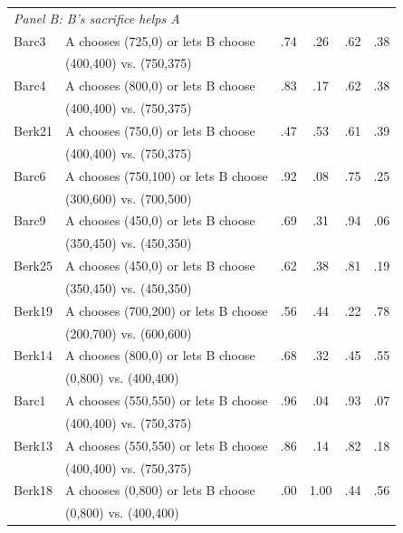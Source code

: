 \documentclass[11pt]{article}
\theoremstyle{definition}
\begin{document}
\begin{table}[h!]
\begin{center}
\begin{tabular}{llcccc}
\multicolumn{6}{l}{\textit{Panel B: B's sacrifice helps A}} \\[0.5ex]
Barc3 & A chooses (725,0) or lets B choose & .74 & .26 & .62 & .38 \\
& (400,400) vs. (750,375) & & & & \\
Barc4 & A chooses (800,0) or lets B choose & .83 & .17 & .62 & .38 \\
& (400,400) vs. (750,375) & & & & \\
Berk21 & A chooses (750,0) or lets B choose & .47 & .53 & .61 & .39 \\
& (400,400) vs. (750,375) & & & & \\
Barc6 & A chooses (750,100) or lets B choose & .92 & .08 & .75 & .25 \\
& (300,600) vs. (700,500) & & & & \\
Barc9 & A chooses (450,0) or lets B choose & .69 & .31 & .94 & .06 \\
& (350,450) vs. (450,350) & & & & \\
Berk25 & A chooses (450,0) or lets B choose & .62 & .38 & .81 & .19 \\
& (350,450) vs. (450,350) & & & & \\
Berk19 & A chooses (700,200) or lets B choose & .56 & .44 & .22 & .78 \\
& (200,700) vs. (600,600) & & & & \\
Berk14 & A chooses (800,0) or lets B choose & .68 & .32 & .45 & .55 \\
& (0,800) vs. (400,400) & & & & \\
Barc1 & A chooses (550,550) or lets B choose & .96 & .04 & .93 & .07 \\
& (400,400) vs. (750,375) & & & & \\
Berk13 & A chooses (550,550) or lets B choose & .86 & .14 & .82 & .18 \\
& (400,400) vs. (750,375) & & & & \\
Berk18 & A chooses (0,800) or lets B choose & .00 & 1.00 & .44 & .56 \\
& (0,800) vs. (400,400) & & & & \\[1ex]


\end{tabular}
\end{center}
\end{table}
\end{document}
